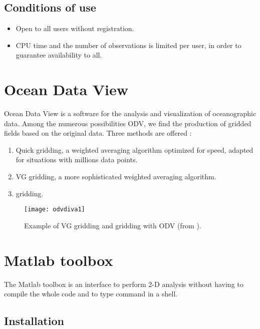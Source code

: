 \subsection{Conditions of use}


\begin{itemize}
\item Open to all users without registration.
\item CPU time and the number of observations is limited per user, in order to guarantee availability to all.
\end{itemize}


\section{Ocean Data View}

Ocean Data View \citep[ODV,][]{SCHLITZER02} is a software for the analysis and visualization of oceanographic data. Among the numerous possibilities ODV, we find the production of gridded fields based on the original data. Three methods are offered \citep{SCHLITZER12}: 
\begin{enumerate}
\item Quick gridding, a weighted averaging algorithm optimized for speed, adapted for situations with millions data points.
\item VG gridding, a more sophisticated weighted averaging algorithm.
\item \diva gridding.
\end{enumerate}

\begin{figure}[H]
\centering 
\texttt{[image: odvdiva1]}
\caption{Example of VG gridding and \diva gridding with ODV (from \citet{SCHLITZER12}).\label{fig:divaonweb6}}
\end{figure}

\section{Matlab toolbox}

The \diva Matlab toolbox is an interface to perform 2-D analysis without having to compile the whole code and to type command in a shell. 

\subsection{Installation}

